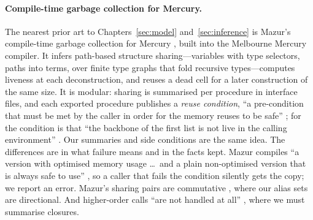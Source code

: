 \paragraph{Compile-time garbage collection for Mercury.} The nearest prior art to Chapters~\ref{sec:model}
and~\ref{sec:inference} is Mazur's compile-time garbage collection for Mercury
\citep{mazur2004thesis,mazur2001practical}, built into the Melbourne Mercury compiler. It infers
path-based structure sharing---variables with type selectors, paths into terms, over finite type graphs
that fold recursive types---computes liveness at each deconstruction, and reuses a dead cell for a later
construction of the same size. It is modular: sharing is summarised per procedure in interface files, and
each exported procedure publishes a \emph{reuse condition}, ``a pre-condition that must be met by the
caller in order for the memory reuses to be safe'' \citep[Ch.~14, p.~317]{mazur2004thesis}; for
 the condition is that ``the backbone of the first list is not live in the calling
environment'' \citep[\S10.3.3, p.~213]{mazur2004thesis}. Our summaries and side conditions are the same
idea. The differences are in what failure means and in the facts kept. Mazur compiles ``a version with
optimised memory usage \ldots\ and a plain non-optimised version that is always safe to use''
\citep[p.~317]{mazur2004thesis}, so a caller that fails the condition silently gets the copy; we report an
error. Mazur's sharing pairs are commutative \citep[\S6.4]{mazur2004thesis}, where our alias sets are
directional. And higher-order calls ``are not handled at all'' \citep[\S12.7, p.~284]{mazur2004thesis},
where we must summarise closures.

